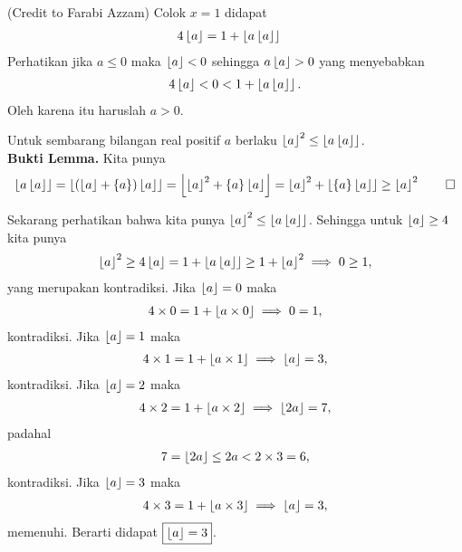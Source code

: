 \begin{solusi}[2]
    (Credit to Farabi Azzam) Colok $x=1$ didapat
    \begin{align*}
        4 \left\lfloor a \right\rfloor &= 1 + \left\lfloor a\left\lfloor a \right\rfloor \right\rfloor
    \end{align*}
    Perhatikan jika $a \le 0$ maka $\left\lfloor a \right\rfloor < 0$ sehingga $a \left\lfloor a \right\rfloor > 0$ yang menyebabkan
    \begin{align*}
        4 \left\lfloor a \right\rfloor < 0 < 1 + \left\lfloor a\left\lfloor a \right\rfloor \right\rfloor.
    \end{align*}
    Oleh karena itu haruslah $a > 0$. 
    \begin{lemma}
        Untuk sembarang bilangan real positif $a$ berlaku $\left\lfloor a \right\rfloor^2 \le \left\lfloor a\left\lfloor a \right\rfloor \right\rfloor$.\\
        \textbf{Bukti Lemma.} Kita punya
        \begin{align*}
            \left\lfloor a \left\lfloor a \right\rfloor \right\rfloor = \left\lfloor (\left\lfloor a \right\rfloor+\{a\})\left\lfloor a \right\rfloor \right\rfloor=\left\lfloor \left\lfloor a \right\rfloor^2+\{a\}\left\lfloor a \right\rfloor \right\rfloor=\left\lfloor a \right\rfloor^2+\left\lfloor \{a\}\left\lfloor a \right\rfloor \right\rfloor \ge \left\lfloor a \right\rfloor^2 \qed
        \end{align*} 
    \end{lemma}
    Sekarang perhatikan bahwa kita punya $\left\lfloor a \right\rfloor^2 \le \left\lfloor a\left\lfloor a \right\rfloor \right\rfloor$. Sehingga untuk $\left\lfloor a \right\rfloor \ge 4$ kita punya
    \begin{align*}
        \left\lfloor a \right\rfloor^2 \ge 4\left\lfloor a \right\rfloor = 1 + \left\lfloor a\left\lfloor a \right\rfloor \right\rfloor \ge 1 + \left\lfloor a \right\rfloor^2 \implies 0 \ge 1,
    \end{align*}
    yang merupakan kontradiksi. Jika $\left\lfloor a \right\rfloor=0$ maka
    \begin{align*}
        4 \times 0 = 1 + \left\lfloor a \times 0 \right\rfloor \implies 0 = 1,
    \end{align*}
    kontradiksi. Jika $\left\lfloor a \right\rfloor=1$ maka
    \begin{align*}
        4\times 1 = 1 + \left\lfloor a \times 1 \right\rfloor \implies \left\lfloor a \right\rfloor = 3,
    \end{align*}
    kontradiksi. Jika $\left\lfloor a \right\rfloor=2$ maka
    \begin{align*}
        4\times 2 = 1 + \left\lfloor a \times 2 \right\rfloor \implies \left\lfloor 2a \right\rfloor = 7,
    \end{align*}
    padahal
    \begin{align*}
        7 = \left\lfloor 2a \right\rfloor \le 2a < 2 \times 3 = 6,
    \end{align*}
    kontradiksi. Jika $\left\lfloor a \right\rfloor=3$ maka
    \begin{align*}
        4\times 3 = 1 + \left\lfloor a \times 3 \right\rfloor \implies \left\lfloor a \right\rfloor = 3,
    \end{align*}
    memenuhi. Berarti didapat $\boxed{\left\lfloor a \right\rfloor=3}$.
\end{solusi}